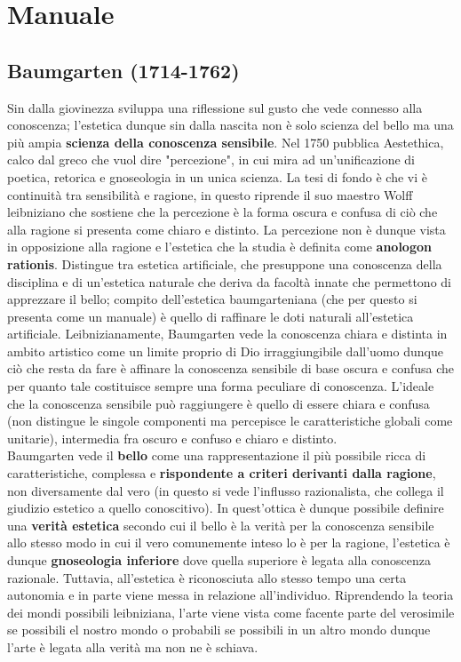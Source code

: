 \documentclass[10pt,a4paper]{article}
\begin{document}
\section{Manuale}
\subsection{Baumgarten (1714-1762)}
Sin dalla giovinezza sviluppa una riflessione sul gusto che vede connesso alla conoscenza; l'estetica dunque sin dalla nascita non è solo scienza del bello ma una più ampia \textbf{scienza della conoscenza sensibile}. Nel 1750 pubblica Aestethica, calco dal greco che vuol dire "percezione", in cui mira ad un'unificazione di poetica, retorica e gnoseologia in un unica scienza. La tesi di fondo è che vi è continuità tra sensibilità e ragione, in questo riprende il suo maestro Wolff leibniziano che sostiene che la percezione è la forma oscura e confusa di ciò che alla ragione si presenta come chiaro e distinto. La percezione non è dunque vista in opposizione alla ragione e l'estetica che la studia è definita come \textbf{anologon rationis}. Distingue tra estetica artificiale, che presuppone una conoscenza della disciplina e di un'estetica naturale che deriva da facoltà innate che permettono di apprezzare il bello; compito dell'estetica baumgarteniana (che per questo si presenta come un manuale) è quello di raffinare le doti naturali all'estetica artificiale. Leibnizianamente, Baumgarten vede la conoscenza chiara e distinta in ambito artistico come un limite proprio di Dio irraggiungibile dall'uomo dunque ciò che resta da fare è affinare la conoscenza sensibile di base oscura e confusa che per quanto tale costituisce sempre una forma peculiare di conoscenza. L'ideale che la conoscenza sensibile può raggiungere è quello di essere chiara e confusa (non distingue le singole componenti ma percepisce le caratteristiche globali come unitarie), intermedia fra oscuro e confuso e chiaro e distinto.\\
Baumgarten vede il \textbf{bello} come una rappresentazione il più possibile ricca di caratteristiche, complessa e \textbf{rispondente a criteri derivanti dalla ragione}, non diversamente dal vero (in questo si vede l'influsso razionalista, che collega il giudizio estetico a quello conoscitivo). In quest'ottica è dunque possibile definire una \textbf{verità estetica} secondo cui il bello è la verità per la conoscenza sensibile allo stesso modo in cui il vero comunemente inteso lo è per la ragione, l'estetica è dunque \textbf{gnoseologia inferiore} dove quella superiore è legata alla conoscenza razionale. Tuttavia, all'estetica è riconosciuta allo stesso tempo una certa autonomia e in parte viene messa in relazione all'individuo. Riprendendo la teoria dei mondi possibili leibniziana, l'arte viene vista come facente parte del verosimile se possibili el nostro mondo o probabili se possibili in un altro mondo dunque l'arte è legata alla verità ma non ne è schiava. 
\end{document}
